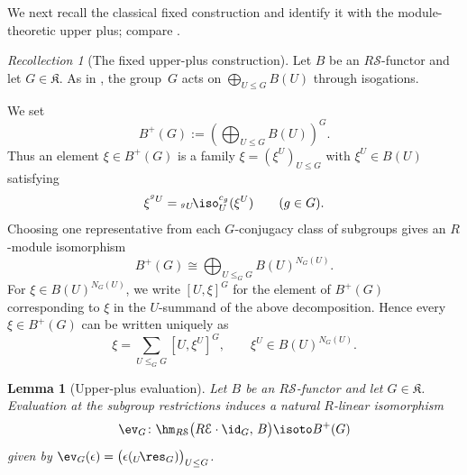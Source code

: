 \documentclass{amsart}
\numberwithin{equation}{section}%
\newtheorem{Lem}[equation]{Lemma}
\theoremstyle{remark}
\newtheorem{Rec}[equation]{Recollection}
\theoremstyle{definition}
\newcommand{\e}{\mathcal E}
\newcommand{\s}{\mathcal S}
\newcommand{\lres}[1]{{}_{#1}\!\res}
\newcommand{\liso}[1]{{}_{#1}\!\iso}
\begin{document}
We next recall the classical fixed construction and identify it with
the module-theoretic upper plus; compare
\cite[Sec.~2.1]{Boltje98a}.
%
\begin{Rec}[The fixed upper-plus construction]
\label{rec:fixed-upper-plus}
Let $B$ be an $R\s$-functor and let $G\in\mathfrak K$.
As in , the group~$G$ acts on
$\bigoplus\limits_{U\leq G}B(U)$ through isogations.

We set
%
\[
B^+(G)
:=
\left(
\bigoplus_{U\leq G}B(U)
\right)^G.
\]
%
Thus an element $\xi\in B^+(G)$ is a family
$\xi=(\xi^U)_{U\leq G}$ with $\xi^U\in B(U)$ satisfying
%
\begin{equation}
\label{eq:upper-plus-equivariance}
\xi^{{}^gU}
=
\liso{{}^gU}_U^{c_g}(\xi^U)
\qquad
(g\in G).
\end{equation}
%
Choosing one representative from each $G$-conjugacy class of
subgroups gives an $R$-module isomorphism
%
\[
B^+(G)
\cong
\bigoplus_{U\leq_GG}
B(U)^{N_G(U)}.
\]
%
For $\xi\in B(U)^{N_G(U)}$, we write $[U,\xi]^G$ for the element
of $B^+(G)$ corresponding to $\xi$ in the $U$-summand of the
above decomposition.
Hence every $\xi\in B^+(G)$ can be written uniquely as
%
\[
\xi
=
\sum_{U\leq_GG}[U,\xi^U]^G,
\qquad
\xi^U\in B(U)^{N_G(U)}.
\]
\end{Rec}
%
\begin{Lem}[Upper-plus evaluation]
\label{lem:upper-plus-evaluation}
Let $B$ be an $R\s$-functor and let $G\in\mathfrak K$.
Evaluation at the subgroup restrictions induces a natural
$R$-linear isomorphism
%
\[
\ev_G\colon
\hm_{R\s}
\bigl(
R\e\cdot\id_G,\,
B
\bigr)
\isoto
B^+(G)
\]
%
given by
$\ev_G(\epsilon)
=
\bigl(
\epsilon(\lres{U}_G)
\bigr)_{U\leq G}$.
\end{Lem}
%
\end{document}
